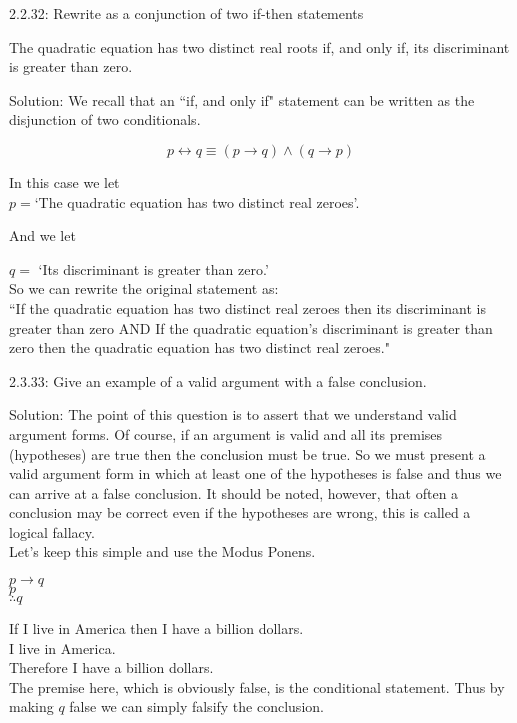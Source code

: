 \documentclass[16 pt]{amsart}
\theoremstyle{definition}
\theoremstyle{remark}
\numberwithin{equation}{subsection}
\begin{document}
\newpage

2.2.32: Rewrite as a conjunction of two if-then statements

The quadratic equation has two distinct real roots if, and only if, its discriminant is greater than zero.


\vspace{1in}

Solution: We recall that an ``if, and only if" statement can be written as the disjunction of two conditionals.

\[
p \leftrightarrow q \equiv (p\rightarrow q) \wedge (q \rightarrow p)
\]

In this case we let\\

 $p = $`The quadratic equation has two distinct real zeroes'.  
 
 And we let

$q = $ `Its discriminant is greater than zero.'\\



So we can rewrite the original statement as:\\



``If the quadratic equation has two distinct real zeroes then its discriminant is greater than zero AND If the quadratic equation's discriminant is greater than zero then the quadratic equation has two distinct real zeroes."

\newpage

2.3.33: Give an example of a valid argument with a false conclusion.


\vspace{1in}

Solution: The point of this question is to assert that we understand valid argument forms. Of course, if an argument is valid and all its premises (hypotheses) are true then the conclusion must be true.  So we must present a valid argument form in which at least one of the hypotheses is false and thus we can arrive at a false conclusion.  It should be noted, however, that often a conclusion may be correct even if the hypotheses are wrong, this is called a logical fallacy.\\

Let's keep this simple and use the Modus Ponens.
\begin{center}
$p\rightarrow q$\\
$p$\\
$\therefore q$\\
\end{center}

\vspace{.25in}



If I live in America then I have a billion dollars.\\

I live in America.\\

Therefore I have a billion dollars.\\




The premise here, which is obviously false, is the conditional statement.  Thus by making $q$ false we can simply falsify the conclusion.
\end{document}
